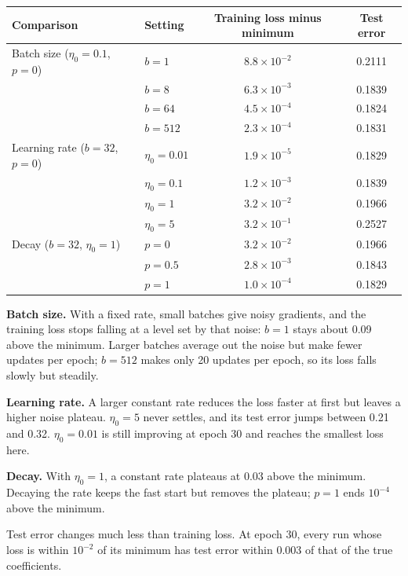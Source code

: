 \documentclass[11pt]{article}
\begin{document}
\begin{center}
\begin{tabular}{llcc}
\toprule
\textbf{Comparison} & \textbf{Setting} & \textbf{Training loss minus minimum} & \textbf{Test error} \\
\midrule
Batch size ($\eta_0=0.1$, $p=0$) & $b=1$ & $8.8\times10^{-2}$ & 0.2111 \\
 & $b=8$ & $6.3\times10^{-3}$ & 0.1839 \\
 & $b=64$ & $4.5\times10^{-4}$ & 0.1824 \\
 & $b=512$ & $2.3\times10^{-4}$ & 0.1831 \\
\midrule
Learning rate ($b=32$, $p=0$) & $\eta_0=0.01$ & $1.9\times10^{-5}$ & 0.1829 \\
 & $\eta_0=0.1$ & $1.2\times10^{-3}$ & 0.1839 \\
 & $\eta_0=1$ & $3.2\times10^{-2}$ & 0.1966 \\
 & $\eta_0=5$ & $3.2\times10^{-1}$ & 0.2527 \\
\midrule
Decay ($b=32$, $\eta_0=1$) & $p=0$ & $3.2\times10^{-2}$ & 0.1966 \\
 & $p=0.5$ & $2.8\times10^{-3}$ & 0.1843 \\
 & $p=1$ & $1.0\times10^{-4}$ & 0.1829 \\
\bottomrule
\end{tabular}
\end{center}

\textbf{Batch size.} With a fixed rate, small batches give noisy gradients, and the training loss stops falling
at a level set by that noise: $b=1$ stays about 0.09 above the minimum. Larger batches average out the noise but
make fewer updates per epoch; $b=512$ makes only 20 updates per epoch, so its loss falls slowly but steadily.

\textbf{Learning rate.} A larger constant rate reduces the loss faster at first but leaves a higher noise
plateau. $\eta_0=5$ never settles, and its test error jumps between 0.21 and 0.32. $\eta_0=0.01$ is still
improving at epoch 30 and reaches the smallest loss here.

\textbf{Decay.} With $\eta_0=1$, a constant rate plateaus at 0.03 above the minimum. Decaying the rate keeps the
fast start but removes the plateau; $p=1$ ends $10^{-4}$ above the minimum.

Test error changes much less than training loss. At epoch 30, every run whose loss is within $10^{-2}$ of its
minimum has test error within 0.003 of that of the true coefficients.
\end{document}

